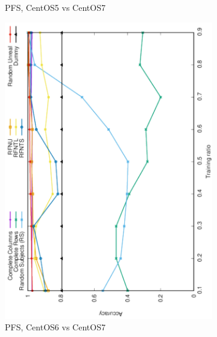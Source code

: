 \documentclass[10pt, conference, compsocconf]{IEEEtran}
\begin{document}
\begin{figure}
\begin{subfigure}[b]{0.4\linewidth}
        \caption{PFS, CentOS5 vs CentOS7}
\end{subfigure}
\begin{subfigure}[b]{0.4\linewidth}
        \includegraphics[width=0.8\columnwidth, angle=-90]{data/results/means_of_results/ALS/PreFreeSurfer/ALS-PFS-6v7.pdf}
        \caption{PFS, CentOS6 vs CentOS7}
\end{subfigure}\hfill
\begin{subfigure}[b]{0.4\linewidth}

\end{subfigure}
\end{figure}
\end{document}
